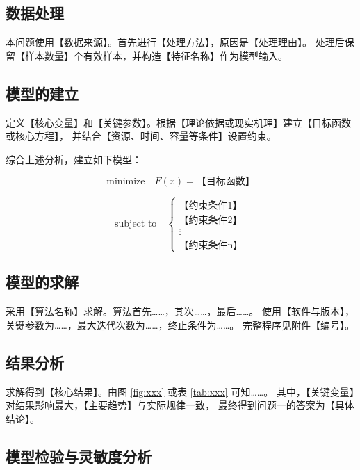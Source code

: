 \documentclass[withoutpreface,bwprint]{cumcmthesis}
\begin{document}
\subsection{数据处理}

本问题使用【数据来源】。首先进行【处理方法】，原因是【处理理由】。
处理后保留【样本数量】个有效样本，并构造【特征名称】作为模型输入。

\subsection{模型的建立}

定义【核心变量】和【关键参数】。根据【理论依据或现实机理】建立【目标函数或核心方程】，
并结合【资源、时间、容量等条件】设置约束。

综合上述分析，建立如下模型：

\begin{equation}
	\text{minimize} \quad F(x) = \text{【目标函数】}
\end{equation}

\begin{equation}
	\text{subject to} \quad \left\{
	\begin{array}{l}
		\text{【约束条件1】} \\
		\text{【约束条件2】} \\
		\vdots \\
		\text{【约束条件n】}
	\end{array}
	\right.
\end{equation}

\subsection{模型的求解}

采用【算法名称】求解。算法首先……，其次……，最后……。
使用【软件与版本】，关键参数为……，最大迭代次数为……，终止条件为……。
完整程序见附件【编号】。

\subsection{结果分析}

求解得到【核心结果】。由图 \ref{fig:xxx} 或表 \ref{tab:xxx} 可知……。
其中，【关键变量】对结果影响最大，【主要趋势】与实际规律一致，
最终得到问题一的答案为【具体结论】。

\subsection{模型检验与灵敏度分析}
\end{document}

